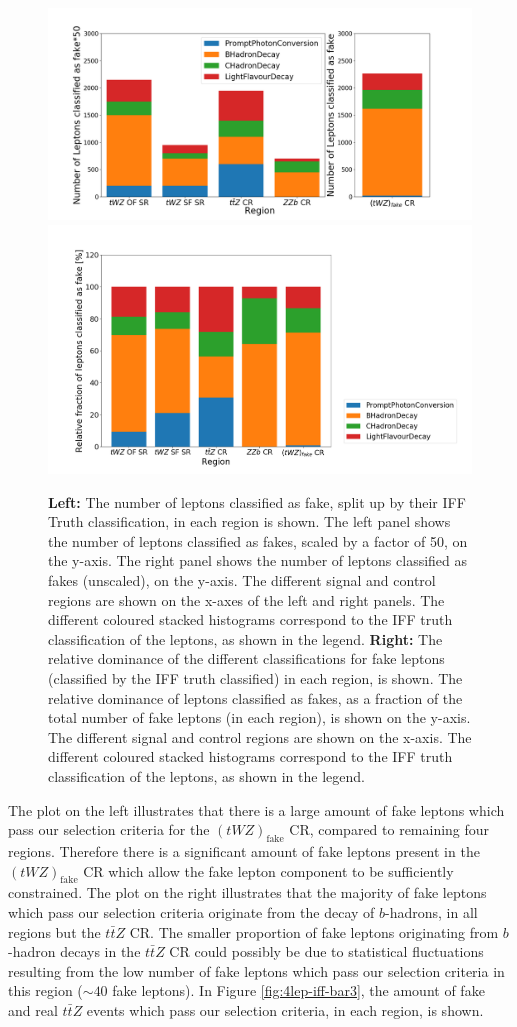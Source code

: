 \begin{figure}[htbp]
\centering

    \includegraphics[width=.47\textwidth]{figures/iff_bar_1.png}   
     \includegraphics[width=.47\textwidth]{figures/iff_bar_2.png} 

    \caption{\textbf{Left: }The number of leptons classified as fake, split up by their IFF Truth classification, in each region is shown. The left panel shows the number of leptons classified as fakes, scaled by a factor of 50, on the y-axis. The right panel shows the number of leptons classified as fakes (unscaled), on the y-axis. The different signal and control regions are shown on the x-axes of the left and right panels. The different coloured stacked histograms correspond to the IFF truth classification of the leptons, as shown in the legend. \textbf{Right: }The relative dominance of the different classifications for fake leptons (classified by the IFF truth classified) in each region, is shown. The relative dominance of leptons classified as fakes, as a fraction of the total number of fake leptons (in each region), is shown on the y-axis. The different signal and control regions are shown on the x-axis. The different coloured stacked histograms correspond to the IFF truth classification of the leptons, as shown in the legend.}
  \label{fig:4lep-iff-bar1}
\end{figure}The plot on the left illustrates that there is a large amount of fake leptons which pass our selection criteria for the $(tWZ)_{\text{fake}}$ CR, compared to remaining four regions. Therefore there is a significant amount of fake leptons present in the $(tWZ)_{\text{fake}}$ CR which allow the fake lepton component to be sufficiently constrained. The plot on the right illustrates that the majority of fake leptons which pass our selection criteria originate from the decay of $b$-hadrons, in all regions but the $t\bar{t}Z$ CR. The smaller proportion of fake leptons originating from $b$-hadron decays in the $t\bar{t}Z$ CR could possibly be due to statistical fluctuations resulting from the low number of fake leptons which pass our selection criteria in this region ($\sim 40$ fake leptons). In Figure \ref{fig:4lep-iff-bar3}, the amount of fake and real $t\bar{t}Z$ events which pass our selection criteria, in each region, is shown.
